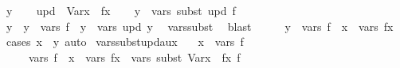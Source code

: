 \begin{isabellebody}
\ y\isanewline
\ \ \isamarkupfalse%
\ {\isacharquery}{\kern0pt}upd\ {\isacharequal}{\kern0pt}\ {\isachardoublequoteopen}Var{\isacharparenleft}{\kern0pt}x\ {\isacharcolon}{\kern0pt}{\isacharequal}{\kern0pt}\ fx{\isacharparenright}{\kern0pt}{\isachardoublequoteclose}\isanewline
\ \ \isamarkupfalse%
\ {\isachardoublequoteopen}y\ {\isasymin}\ vars\ {\isacharparenleft}{\kern0pt}subst\ {\isacharquery}{\kern0pt}upd\ f{\isacharparenright}{\kern0pt}{\isachardoublequoteclose}\isanewline
\ \ \isamarkupfalse%
\ \isamarkupfalse%
\ y{\isacharprime}{\kern0pt}\ \ {\isachardoublequoteopen}y{\isacharprime}{\kern0pt}\ {\isasymin}\ vars\ f\ {\isasymand}\ y\ {\isasymin}\ vars\ {\isacharparenleft}{\kern0pt}{\isacharquery}{\kern0pt}upd\ y{\isacharprime}{\kern0pt}{\isacharparenright}{\kern0pt}{\isachardoublequoteclose}\ \isamarkupfalse%
\ vars{\isacharunderscore}{\kern0pt}subst\ \isamarkupfalse%
\ blast\isanewline
\ \ \isamarkupfalse%
\ \isamarkupfalse%
\ {\isachardoublequoteopen}y\ {\isasymin}\ vars\ f\ {\isacharminus}{\kern0pt}\ {\isacharbraceleft}{\kern0pt}x{\isacharbraceright}{\kern0pt}\ {\isasymunion}\ vars\ fx{\isachardoublequoteclose}\ \isamarkupfalse%
\ {\isacharparenleft}{\kern0pt}cases\ {\isachardoublequoteopen}x\ {\isacharequal}{\kern0pt}\ y{\isacharprime}{\kern0pt}{\isachardoublequoteclose}{\isacharparenright}{\kern0pt}\ auto\isanewline
{}\isamarkupfalse%
%
\endisatagproof
{\isafoldproof}%
%
\isadelimproof
\isanewline
%
\endisadelimproof
\isanewline
{}\isamarkupfalse%
\ vars{\isacharunderscore}{\kern0pt}subst{\isacharunderscore}{\kern0pt}upd{\isacharunderscore}{\kern0pt}aux{\isacharcolon}{\kern0pt}\isanewline
\ \ \ {\isachardoublequoteopen}x\ {\isasymin}\ vars\ f{\isachardoublequoteclose}\isanewline
\ \ \ \ \ {\isachardoublequoteopen}vars\ f\ {\isacharminus}{\kern0pt}\ {\isacharbraceleft}{\kern0pt}x{\isacharbraceright}{\kern0pt}\ {\isasymunion}\ vars\ fx\ {\isasymsubseteq}\ vars\ {\isacharparenleft}{\kern0pt}subst\ {\isacharparenleft}{\kern0pt}Var{\isacharparenleft}{\kern0pt}x\ {\isacharcolon}{\kern0pt}{\isacharequal}{\kern0pt}\ fx{\isacharparenright}{\kern0pt}{\isacharparenright}{\kern0pt}\ f{\isacharparenright}{\kern0pt}{\isachardoublequoteclose}\isanewline
%
\isadelimproof
%
\endisadelimproof
%
\isatagproof
{}\isamarkupfalse%
\isanewline
\ \ \isamarkupfalse%

\end{isabellebody}
